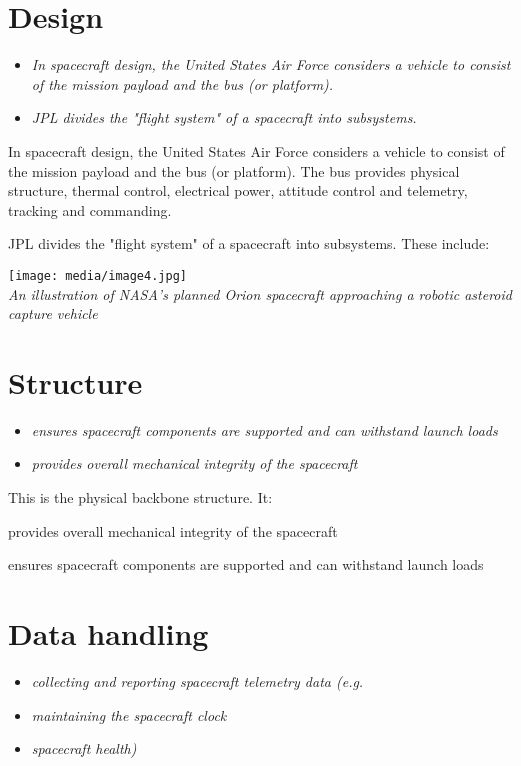 \section{Design}\label{design}

\begin{itemize}
\item
  \emph{In spacecraft design, the United States Air Force considers a
  vehicle to consist of the mission payload and the bus (or platform).}
\item
  \emph{JPL divides the "flight system" of a spacecraft into
  subsystems.}
\end{itemize}

In spacecraft design, the United States Air Force considers a vehicle to
consist of the mission payload and the bus (or platform). The bus
provides physical structure, thermal control, electrical power, attitude
control and telemetry, tracking and commanding.

JPL divides the "flight system" of a spacecraft into subsystems. These
include:

\texttt{[image: media/image4.jpg]}\\
\emph{An illustration of NASA's planned Orion spacecraft approaching a
robotic asteroid capture vehicle}

\section{Structure}\label{structure}

\begin{itemize}
\item
  \emph{ensures spacecraft components are supported and can withstand
  launch loads}
\item
  \emph{provides overall mechanical integrity of the spacecraft}
\end{itemize}

This is the physical backbone structure. It:

provides overall mechanical integrity of the spacecraft

ensures spacecraft components are supported and can withstand launch
loads

\section{Data handling}\label{data-handling}

\begin{itemize}
\item
  \emph{collecting and reporting spacecraft telemetry data (e.g.}
\item
  \emph{maintaining the spacecraft clock}
\item
  \emph{spacecraft health)}
\end{itemize}

